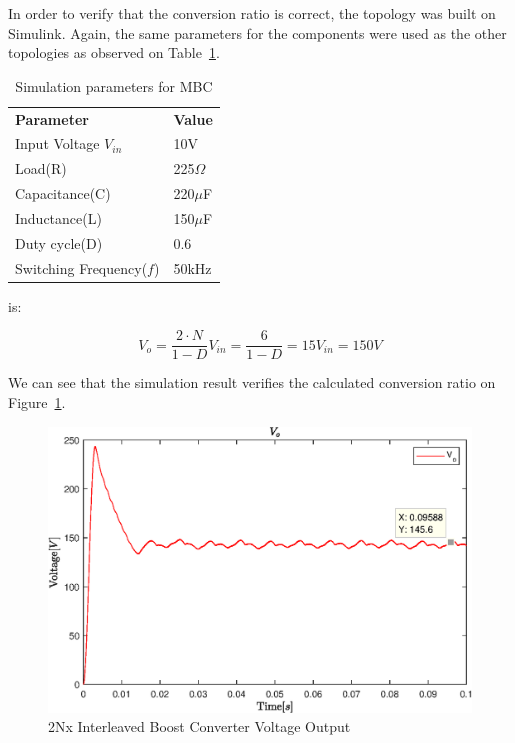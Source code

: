 In order to verify that the conversion ratio is correct,
the topology was built on Simulink. 
Again, the same parameters for the components were used as the other topologies as observed on Table~\ref{tab:MBC_2Nx}.

\begin{table}[H]
\begin{center}
\caption {Simulation parameters for MBC} \label{tab:MBC_2Nx} 
\begin{tabular}{|l|l|}
\cline{1-2}
\textbf{Parameter} & \textbf{Value}  \\ \cline{1-2}
Input Voltage $V_{in}$          &      10V   \\ \cline{1-2}
Load(R)   & 225$\Omega$           \\ \cline{1-2}
Capacitance(C)          &       220$\mu$F     \\ \cline{1-2}
Inductance(L)          &      150$\mu$F      \\ \cline{1-2}
Duty cycle(D)          &     0.6       \\ \cline{1-2}
Switching Frequency($f$)          &      50kHz      \\ \cline{1-2}
\end{tabular}
\end{center}
\end{table}is:

\begin{equation}
	V_o = \frac{2\cdot N}{1-D}V_{in} = \frac{6}{1-D}  = 15V_{in}=150V
\end{equation}


We can see that the simulation result verifies the calculated conversion ratio on Figure~\ref{fig:MBC_2NxSimResult}.\\

\begin{figure}[H]
   \centering
   \includegraphics[width=\textwidth]{figures/yy2NxMultilevelBC/2Nx_SimResults.eps}
    \caption{2Nx Interleaved Boost Converter Voltage Output}
	\label{fig:MBC_2NxSimResult}
\end{figure}


